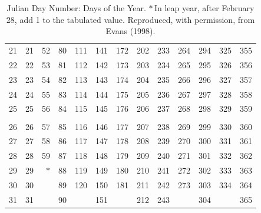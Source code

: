 \begin{table}[!h]
\begin{tabular}{r|rrrrrrrrrrrr}
21 & 21 & 52 & 80 & 111& 141& 172& 202& 233& 264& 294& 325& 355\\
22& 22& 53& 81& 112& 142& 173& 203& 234& 265& 295& 326& 356\\
23& 23& 54& 82& 113& 143& 174& 204& 235& 266&296& 327& 357\\
24& 24& 55& 83& 114& 144& 175& 205& 236& 267& 297& 328& 358\\
25&25&56& 84& 115& 145& 176& 206& 237& 268& 298& 329& 359\\
&&&&&&&&&&&&\\
26& 26& 57& 85& 116& 146& 177& 207& 238& 269& 299& 330& 360\\
27& 27& 58& 86& 117& 147& 178& 208& 239& 270& 300& 331& 361\\
28& 28& 59& 87& 118&148& 179& 209& 240& 271& 301& 332& 362\\
29&29&$\ast$&88&119& 149& 180& 210& 241& 272& 302& 333& 363\\
30&30&&89&120&150& 181& 211& 242& 273& 303& 334& 364\\
31&31&&90&&151&&212&243&&304&&365\\
\end{tabular}
\caption{Julian Day Number: Days of the Year. $\ast$\,In leap year,
after February 28, add 1 to the tabulated value. Reproduced, with permission, from Evans (1998).}\label{kt3}
\end{table}
